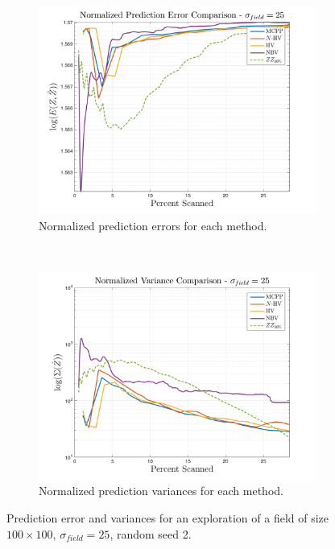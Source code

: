 \begin{figure}[htb!]
    \centering
    \begin{subfigure}[t]{0.75\textwidth}
        \centering
        \includegraphics[width=\linewidth]{figures/normalized_errors_30p_100x100_sf_25_seed_2_app_10.png}
        \captionsetup{skip=0.20\baselineskip,size=footnotesize}
        \caption{Normalized prediction errors for each method.}
    \end{subfigure}%
    \\
    \begin{subfigure}[t]{0.75\textwidth}
        \centering
        \includegraphics[width=\linewidth]{figures/normalized_variances_30p_100x100_sf_25_seed_2_app_10.png}
        \captionsetup{skip=0.20\baselineskip,size=footnotesize}
        \caption{Normalized prediction variances for each method.}
    \end{subfigure}%
    \captionsetup{skip=0.20\baselineskip}
    \caption{Prediction error and variances for an exploration of a field of size $100 \times 100$, $\sigma_{field} = 25$, random seed 2.}
    \label{fig:errvar25}
\end{figure}

